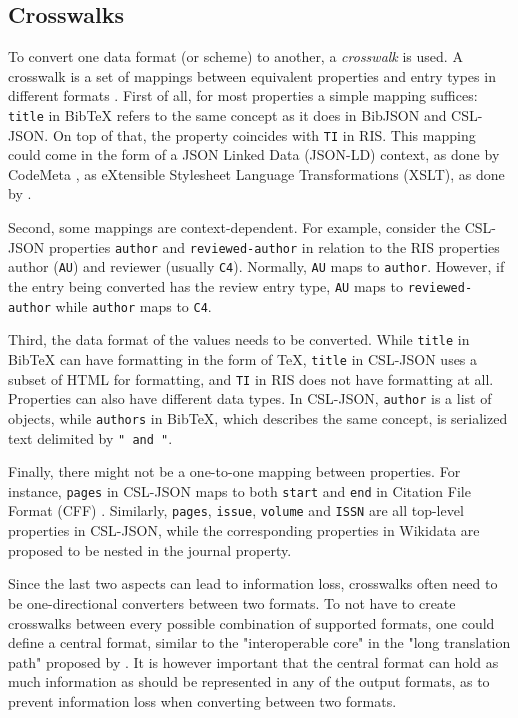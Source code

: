 \documentclass[fleqn,10pt,lineno]{wlpeerj} %
\begin{document}
\subsection*{Crosswalks}

To convert one data format (or scheme) to another, a \emph{crosswalk} is used. A crosswalk is a set of mappings between equivalent properties and entry types in different formats \citep{pierre_issues_1998}. First of all, for most properties a simple mapping suffices: \texttt{title} in BibTeX refers to the same concept as it does in BibJSON and CSL-JSON. On top of that, the property coincides with \texttt{TI} in RIS. This mapping could come in the form of a JSON Linked Data (JSON-LD) context, as done by CodeMeta \citep{jones_codemeta:_2017}, as eXtensible Stylesheet Language Transformations (XSLT), as done by \cite{godby_two_2003}.

Second, some mappings are context-dependent. For example, consider the CSL-JSON properties \texttt{author} and \texttt{reviewed-author} in relation to the RIS properties author (\texttt{AU}) and reviewer (usually \texttt{C4}). Normally, \texttt{AU} maps to \texttt{author}. However, if the entry being converted has the review entry type, \texttt{AU} maps to \texttt{reviewed-author} while \texttt{author} maps to \texttt{C4}.

Third, the data format of the values needs to be converted. While \texttt{title} in BibTeX can have formatting in the form of \TeX, \texttt{title} in CSL-JSON uses a subset of HTML for formatting, and \texttt{TI} in RIS does not have formatting at all. Properties can also have different data types. In CSL-JSON, \texttt{author} is a list of objects, while \texttt{authors} in BibTeX, which describes the same concept, is serialized text delimited by \texttt{" and "}.

Finally, there might not be a one-to-one mapping between properties. For instance, \texttt{pages} in CSL-JSON maps to both \texttt{start} and \texttt{end} in Citation File Format (CFF) \citep{druskat_citation_2018}. Similarly, \texttt{pages}, \texttt{issue}, \texttt{volume} and \texttt{ISSN} are all top-level properties in CSL-JSON, while the corresponding properties in Wikidata are proposed to be nested in the journal property.

Since the last two aspects can lead to information loss, crosswalks often need to be one-directional converters between two formats. To not have to create crosswalks between every possible combination of supported formats, one could define a central format, similar to the "interoperable core" in the "long translation path" proposed by \cite{godby_two_2003}. It is however important that the central format can hold as much information as should be represented in any of the output formats, as to prevent information loss when converting between two formats.
\end{document}

